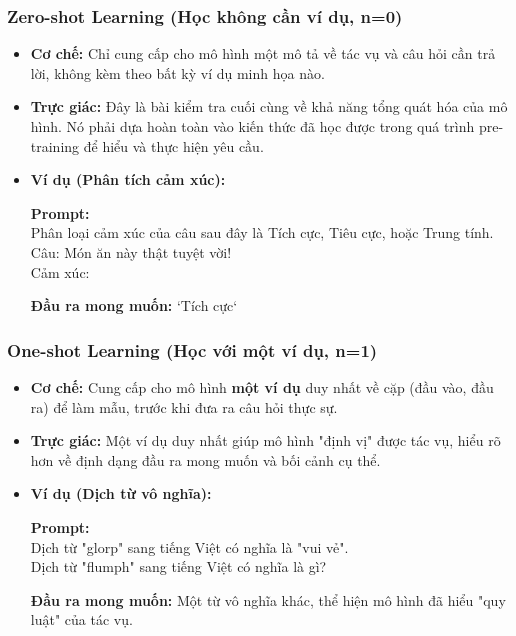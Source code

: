 \subsubsection{Zero-shot Learning (Học không cần ví dụ, n=0)}
\begin{itemize}
    \item \textbf{Cơ chế:} Chỉ cung cấp cho mô hình một mô tả về tác vụ và câu hỏi cần trả lời, không kèm theo bất kỳ ví dụ minh họa nào.
    \item \textbf{Trực giác:} Đây là bài kiểm tra cuối cùng về khả năng tổng quát hóa của mô hình. Nó phải dựa hoàn toàn vào kiến thức đã học được trong quá trình pre-training để hiểu và thực hiện yêu cầu.
    \item \textbf{Ví dụ (Phân tích cảm xúc):}
        \begin{tcolorbox}[colback=gray!5!white, colframe=gray!50!black]
        \textbf{Prompt:} \\
        Phân loại cảm xúc của câu sau đây là Tích cực, Tiêu cực, hoặc Trung tính. \\
        Câu: Món ăn này thật tuyệt vời! \\
        Cảm xúc: 
        \end{tcolorbox}
        \textbf{Đầu ra mong muốn:} `Tích cực`
\end{itemize}

\subsubsection{One-shot Learning (Học với một ví dụ, n=1)}
\begin{itemize}
    \item \textbf{Cơ chế:} Cung cấp cho mô hình \textbf{một ví dụ} duy nhất về cặp (đầu vào, đầu ra) để làm mẫu, trước khi đưa ra câu hỏi thực sự.
    \item \textbf{Trực giác:} Một ví dụ duy nhất giúp mô hình "định vị" được tác vụ, hiểu rõ hơn về định dạng đầu ra mong muốn và bối cảnh cụ thể.
    \item \textbf{Ví dụ (Dịch từ vô nghĩa):}
        \begin{tcolorbox}[colback=gray!5!white, colframe=gray!50!black]
        \textbf{Prompt:} \\
        Dịch từ "glorp" sang tiếng Việt có nghĩa là "vui vẻ". \\
        Dịch từ "flumph" sang tiếng Việt có nghĩa là gì?
        \end{tcolorbox}
        \textbf{Đầu ra mong muốn:} Một từ vô nghĩa khác, thể hiện mô hình đã hiểu "quy luật" của tác vụ.
\end{itemize}

